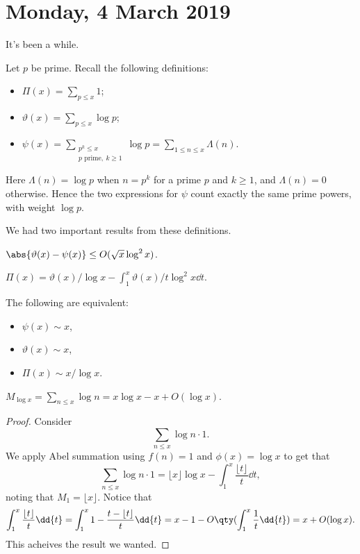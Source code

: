 
\section{Monday, 4 March 2019}

It's been a while.

Let $p$ be prime. Recall the following definitions:
\begin{itemize}
\item $\Pi(x) = \sum_{p \leq x} 1$;
\item $\vartheta(x) = \sum_{p \leq x} \log p$;
\item $%
\psi(x) = \sum_{\substack{p^k\leq x\\p\text{ prime},\ k\geq1}} \log p = \sum_{1\leq n\leq x} \Lambda(n)$.
\end{itemize}
Here $\Lambda(n)=\log p$ when $n=p^k$ for a prime $p$ and $k\geq1$,
and $\Lambda(n)=0$ otherwise. Hence the two expressions for $\psi$ count
exactly the same prime powers, with weight $\log p$.


We had two important results from these definitions.

\begin{theorem}
$\abs{\vartheta(x) - \psi(x)} \leq O(\sqrt{x}\log^2x)$.
\end{theorem}

\begin{theorem}
$\Pi(x) = \vartheta(x)/\log x - \int_1^x \vartheta(x)/t\log^2x \dd{t}$.
\end{theorem}

\begin{theorem}
The following are equivalent:
\begin{itemize}
\item $\psi(x) \sim x$,
\item $\vartheta(x) \sim x$,
\item $\Pi(x) \sim x/\log x$.
\end{itemize}
\end{theorem}

\begin{lemma}
$M_{\log x} = \sum_{n \leq x} \log n = x\log x - x + O(\log x)$.
\end{lemma}

\begin{proof}
Consider 
\[ \sum_{n \leq x} \log n \cdot 1. \]
We apply Abel summation using $f(n) = 1$ and $\phi(x) = \log x$ to get that 
\[ \sum_{n \leq x} \log n \cdot 1 = \lfloor x \rfloor \log x - \int_1^x \frac{\lfloor t \rfloor}{t} \dd{t}, \]
noting that $M_1 = \lfloor x \rfloor$. Notice that 
\[ \int_1^x \frac{\lfloor t \rfloor}{t} \dd{t} = \int_1^x 1 - \frac{t - \lfloor t \rfloor}{t} \dd{t} = x - 1 - O\qty(\int_1^x \frac{1}{t} \dd{t}) = x + O(\log x). \]
This acheives the result we wanted.
\end{proof}

